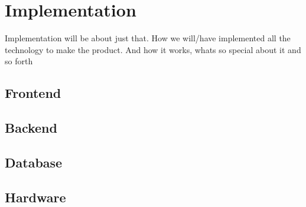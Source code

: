 \chapter{Implementation}
Implementation will be about just that. How we will/have implemented all the technology to make the product. And how it works, whats so special about it and so forth

\section{Frontend}

\section{Backend}

\section{Database}

\section{Hardware}